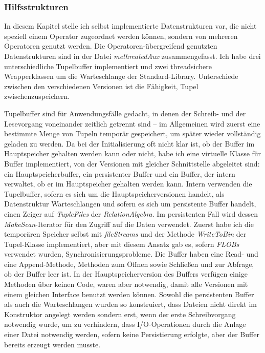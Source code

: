 \documentclass[a4paper,12pt,twoside]{article}
\newcommand{\Fb}[1]{\textit{#1}} %
\begin{document}
\subsubsection{Hilfsstrukturen}
\label{Hilfsstrukturen} 

In diesem Kapitel stelle ich selbst implementierte Datenstrukturen vor, die nicht speziell einem Operator zugeordnet werden können, sondern von mehreren Operatoren genutzt werden. Die Operatoren-übergreifend genutzten Datenstrukturen sind in der Datei \Fb{methreatedAux} zusammengefasst. Ich habe drei unterschiedliche Tupelbuffer implementiert und zwei threadsichere Wrapperklassen um die Warteschlange der Standard-Library. Unterschiede zwischen den verschiedenen Versionen ist die Fähigkeit, Tupel zwischenzuspeichern.

Tupelbuffer sind für Anwendungsfälle gedacht, in denen der Schreib- und der Lesevorgang voneinander zeitlich getrennt sind -- im Allgemeinen wird zuerst eine bestimmte Menge von Tupeln temporär gespeichert, um später wieder vollständig geladen zu werden. Da bei der Initialisierung oft nicht klar ist, ob der Buffer im Hauptspeicher gehalten werden kann oder nicht, habe ich eine virtuelle Klasse für Buffer implementiert, von der Versionen mit gleicher Schnittstelle abgeleitet sind: ein Hauptspeicherbuffer, ein persistenter Buffer und ein Buffer, der intern verwaltet, ob er im Hauptspeicher gehalten werden kann. Intern verwenden die Tupelbuffer, sofern es sich um die Hauptspeicherversionen handelt, als Datenstruktur Warteschlangen und sofern es sich um persistente Buffer handelt, einen Zeiger auf \Fb{TupleFiles} der \Fb{RelationAlgebra}. Im persistenten Fall wird dessen \Fb{MakeScan}-Iterator für den Zugriff auf die Daten verwendet. Zuerst habe ich die temporären Speicher selbst mit \Fb{fileStreams} und der Methode \Fb{WriteToBin} der Tupel-Klasse implementiert, aber mit diesem Ansatz gab es, sofern \Fb{FLOBs} verwendet wurden, Synchronisierungsprobleme. Die Buffer haben eine Read- und eine Append-Methode, Methoden zum Öffnen sowie Schließen und zur Abfrage, ob der Buffer leer ist. In der Hauptspeicherversion des Buffers verfügen einige Methoden über keinen Code, waren aber notwendig, damit alle Versionen mit einem gleichen Interface benutzt werden können. Sowohl die persistenten Buffer als auch die Warteschlangen wurden so konstruiert, dass Dateien nicht direkt im Konstruktor angelegt werden sondern erst, wenn der erste Schreibvorgang notwendig wurde, um zu verhindern, dass I/O-Operationen durch die Anlage einer Datei notwendig werden, sofern keine Persistierung erfolgte, aber der Buffer bereits erzeugt werden musste.
\end{document}

